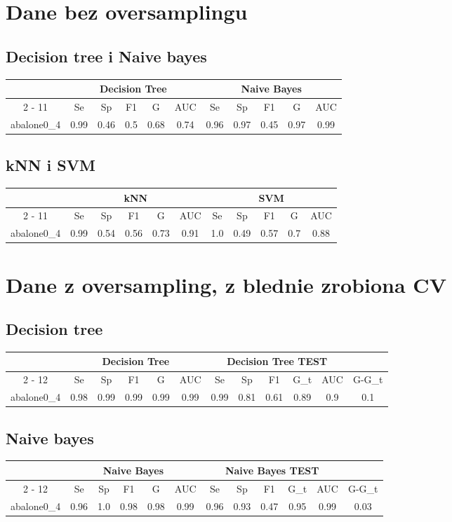 \documentclass{article}%
\begin{document}
%
\normalsize%
\section*{Dane bez oversamplingu}%
\subsection*{Decision tree i Naive bayes}%
\begin{tabular}{|c|c|c|c|c|c|c|c|c|c|c|}%
\hline%
&\multicolumn{5}{|c|}{Decision Tree}&\multicolumn{5}{|c|}{Naive Bayes}\\%
\cline{2%
-%
11}%
&Se&Sp&F1&G&AUC&Se&Sp&F1&G&AUC\\%
\hline%
abalone0\_4&0.99&0.46&0.5&0.68&0.74&0.96&0.97&0.45&0.97&0.99\\%
\hline%
\end{tabular}

%
\subsection*{kNN i SVM}%
\begin{tabular}{|c|c|c|c|c|c|c|c|c|c|c|}%
\hline%
&\multicolumn{5}{|c|}{kNN}&\multicolumn{5}{|c|}{SVM}\\%
\cline{2%
-%
11}%
&Se&Sp&F1&G&AUC&Se&Sp&F1&G&AUC\\%
\hline%
abalone0\_4&0.99&0.54&0.56&0.73&0.91&1.0&0.49&0.57&0.7&0.88\\%
\hline%
\end{tabular}

%
\section*{Dane z oversampling, z blednie zrobiona CV}%
\subsection*{Decision tree}%
\begin{tabular}{|c|c|c|c|c|c|c|c|c|c|c|c|}%
\hline%
&\multicolumn{5}{|c|}{Decision Tree}&\multicolumn{5}{|c|}{Decision Tree TEST}&\\%
\cline{2%
-%
12}%
&Se&Sp&F1&G&AUC&Se&Sp&F1&G\_t&AUC&G{-}G\_t\\%
\hline%
abalone0\_4&0.98&0.99&0.99&0.99&0.99&0.99&0.81&0.61&0.89&0.9&0.1\\%
\hline%
\end{tabular}

%
\subsection*{Naive bayes}%
\begin{tabular}{|c|c|c|c|c|c|c|c|c|c|c|c|}%
\hline%
&\multicolumn{5}{|c|}{Naive Bayes}&\multicolumn{5}{|c|}{Naive Bayes TEST}&\\%
\cline{2%
-%
12}%
&Se&Sp&F1&G&AUC&Se&Sp&F1&G\_t&AUC&G{-}G\_t\\%
\hline%
abalone0\_4&0.96&1.0&0.98&0.98&0.99&0.96&0.93&0.47&0.95&0.99&0.03\\%
\hline%
\end{tabular}
\end{document}
